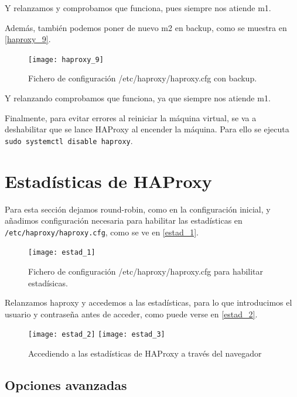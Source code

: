 Y relanzamos y comprobamos que funciona, pues siempre nos atiende m1.

Además, también podemos poner de nuevo m2 en backup, como se muestra en \eqref{haproxy_9}.

\begin{figure}[h!]
\begin{center}
\caption{Fichero de configuración /etc/haproxy/haproxy.cfg con backup.}
\label{haproxy_9}
\texttt{[image: haproxy\_9]}
\end{center}
\end{figure}

Y relanzando comprobamos que funciona, ya que siempre nos atiende m1.

Finalmente, para evitar errores al reiniciar la máquina virtual, se va a deshabilitar que se lance HAProxy al encender la máquina. Para ello se ejecuta \verb|sudo systemctl disable haproxy|.

\chapter{Estadísticas de HAProxy}

Para esta sección dejamos round-robin, como en la configuración inicial, y añadimos configuración necesaria para habilitar las estadísticas en \verb|/etc/haproxy/haproxy.cfg|, como se ve en \eqref{estad_1}.

\begin{figure}[h!]
\begin{center}
\caption{Fichero de configuración /etc/haproxy/haproxy.cfg para habilitar estadísicas.}
\label{estad_1}
\texttt{[image: estad\_1]}
\end{center}
\end{figure}

Relanzamos haproxy y accedemos a las estadísticas, para lo que introducimos el usuario y contraseña antes de acceder, como puede verse en \eqref{estad_2}.

\begin{figure}[h!]
\begin{center}
\caption{Accediendo a las estadísticas de HAProxy a través del navegador}
\label{estad_2}
\texttt{[image: estad\_2]}
\texttt{[image: estad\_3]}
\end{center}
\end{figure}

\section{Opciones avanzadas}


